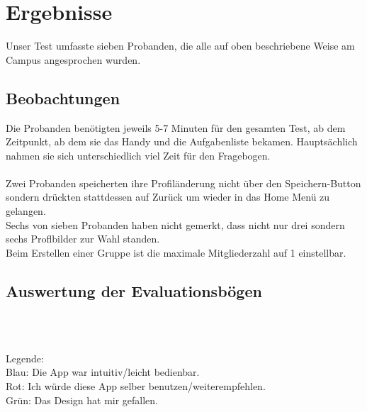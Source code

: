 \documentclass[a4paper]{scrreprt}
\begin{document}
\newpage
\section{Ergebnisse}
Unser Test umfasste sieben Probanden, die alle auf oben beschriebene Weise am Campus angesprochen wurden.

\subsection*{Beobachtungen}
Die Probanden benötigten jeweils 5-7 Minuten für den gesamten Test, ab dem Zeitpunkt, ab dem sie das Handy und die Aufgabenliste bekamen. Hauptsächlich nahmen sie sich unterschiedlich viel Zeit für den Fragebogen.\\
\ \\
Zwei Probanden speicherten ihre Profiländerung nicht über den Speichern-Button sondern drückten stattdessen auf Zurück  um wieder in das Home Menü zu gelangen.
\ \\
Sechs von sieben Probanden haben nicht gemerkt, dass nicht nur drei sondern sechs Proflbilder zur Wahl standen.
\ \\
Beim Erstellen einer Gruppe ist die maximale Mitgliederzahl auf 1 einstellbar. 

\subsection*{Auswertung der Evaluationsbögen}
\ \\
\ \\
Legende: \ \\
Blau: Die App war intuitiv/leicht bedienbar. \\
Rot:  Ich würde diese App selber benutzen/weiterempfehlen. \\
Grün: Das Design hat mir gefallen.
\end{document}
